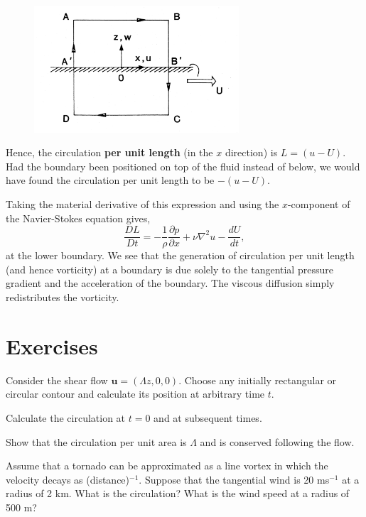 \documentclass[10pt]{report}
\begin{document}
\begin{figure}
\centerline{\includegraphics[width=3in]{Section48.pdf}}
\caption{ }
\label{fig2.8}
\end{figure}

Hence, the circulation \textbf{per unit length} (in the $x$ direction) is $L =
\left( {u-U} \right)$. Had the boundary been positioned on top of the fluid
instead of below, we would have found the circulation per unit length to be
$-\left( {u-U} \right)$.

Taking the material derivative of this expression and using the $x$-component
of the Navier-Stokes equation gives,
\begin{equation}
\frac{DL}{Dt}=-\frac{1}{\rho }\frac{\partial p}{\partial x}+\nu \nabla
^2u-\frac{dU}{dt},
\end{equation}
at the lower boundary. We see that the generation of circulation per unit
length (and hence vorticity) at a boundary is due solely to the tangential
pressure gradient and the acceleration of the boundary. The viscous
diffusion simply redistributes the vorticity.

\divider
\pagebreak

\section{Exercises}

\begin{questionstar}
	Consider the shear flow $\textbf{u} = (\Lambda z, 0, 0)$. Choose any initially
	rectangular or circular contour and calculate its position at arbitrary time $t$.

	Calculate the circulation at $t=0$ and at subsequent times.

	Show that the circulation per unit area is $\Lambda $ and is conserved following the flow.
	\label{qn:shearflowcirc}
\end{questionstar}

\begin{questionstar}

 Assume that a tornado can be approximated as a line vortex in which the
velocity decays as (distance)$^{-1}$. Suppose that the tangential wind is 20
ms$^{-1}$ at a radius of 2 km. What is the circulation? What is the wind
speed at a radius of 500 m?


\label{qn:tornado}
\end{questionstar}
\end{document}
